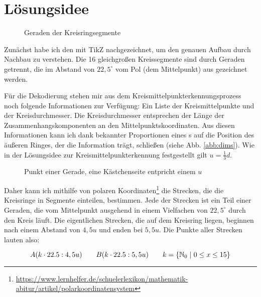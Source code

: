 \section{Lösungsidee}
\begin{wrapfigure}{r}{0.35\textwidth}
  \centering
  
  \caption{Geraden der Kreisringsegmente}
  \label{abb:spidergrafik}
\end{wrapfigure}
Zunächst habe ich den \task{} mit TikZ nachgezeichnet, um den genauen Aufbau durch Nachbau zu verstehen. Die 16 gleichgroßen Kreissegmente sind durch Geraden getrennt, die im Abstand von \(22,5^{\circ}\) vom Pol (dem Mittelpunkt) aus gezeichnet werden.

Für die Dekodierung stehen mir aus dem Kreismittelpunkterkennungsprozess noch folgende Informationen zur Verfügung: Ein Liste der Kreismittelpunkte und der Kreisdurchmesser. Die Kreisdurchmesser entsprechen der Länge der Zusammenhangskomponenten an den Mittelpunktskoordinaten. Aus diesen Informationen kann ich dank bekannter Proportionen eines \task{}s auf die Position des äußeren Ringes, der die Information trägt, schließen (siehe Abb. \ref{abb:dims}). Wie in der Lösungsidee zur Kreismittelpunkterkennung festgestellt gilt \(u=\frac{1}{3}d\).

\begin{figure}[!ht]
	\centering	
	
	\caption{Punkt einer Gerade, eine Kästchenseite entpricht einem \(u\)}
	\label{abb:trigon}
\end{figure}

Daher kann ich mithilfe von polaren Koordinaten\footnote{\url{https://www.lernhelfer.de/schuelerlexikon/mathematik-abitur/artikel/polarkoordinatensystem}} die Strecken, die die Kreisringe in Segmente einteilen, bestimmen. Jede der Strecken ist ein Teil einer Geraden, die vom Mittelpunkt ausgehend in einem Vielfachen von \(22,5^{\circ}\) durch den Kreis läuft. Die eigentlichen Strecken, die auf dem Kreisring liegen, beginnen nach einem Abstand von \(4,5u\) und enden bei \(5,5u\). Die Punkte aller Strecken lauten also:

\begin{displaymath}
A(k \cdot 22.5:4,5u) \hspace{2em} B(k \cdot 22.5:5,5u) \hspace{2em} k = \{\mathbb{N}_0 \hspace{0.3em}|\hspace{0.3em} 0 \le x \le 15\}
\end{displaymath}

